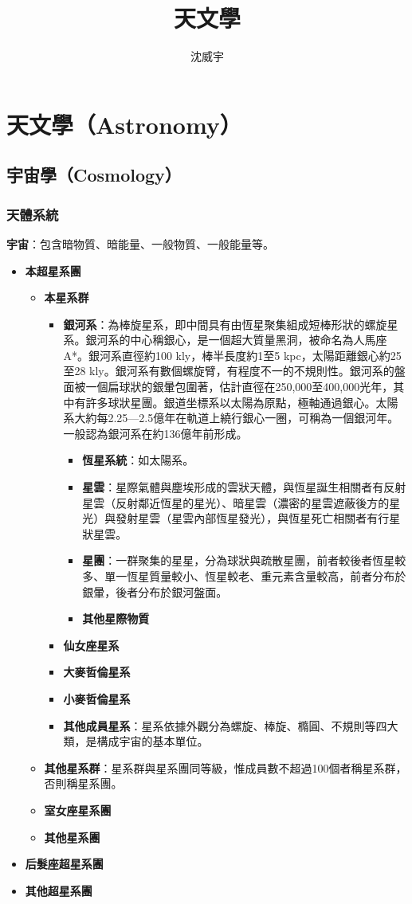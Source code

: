 \documentclass[a4paper,12pt]{report}
\begin{document}
\title{天文學}
\author{沈威宇}
\date{\temtoday}
\titletocdoc
\chapter{天文學（Astronomy）}
\section{宇宙學（Cosmology）}
\subsection{天體系統}
\textbf{宇宙}：包含暗物質、暗能量、一般物質、一般能量等。
\begin{itemize}
\item \textbf{本超星系團}
\begin{itemize}
\item \textbf{本星系群}
\begin{itemize}
\item \textbf{銀河系}：為棒旋星系，即中間具有由恆星聚集組成短棒形狀的螺旋星系。銀河系的中心稱銀心，是一個超大質量黑洞，被命名為人馬座A*。銀河系直徑約100 kly，棒半長度約1至5 kpc，太陽距離銀心約25至28 kly。銀河系有數個螺旋臂，有程度不一的不規則性。銀河系的盤面被一個扁球狀的銀暈包圍著，估計直徑在250,000至400,000光年，其中有許多球狀星團。銀道坐標系以太陽為原點，極軸通過銀心。太陽系大約每2.25—2.5億年在軌道上繞行銀心一圈，可稱為一個銀河年。一般認為銀河系在約136億年前形成。
\begin{itemize}
\item \textbf{恆星系統}：如太陽系。
\item \textbf{星雲}：星際氣體與塵埃形成的雲狀天體，與恆星誕生相關者有反射星雲（反射鄰近恆星的星光）、暗星雲（濃密的星雲遮蔽後方的星光）與發射星雲（星雲內部恆星發光），與恆星死亡相關者有行星狀星雲。
\item \textbf{星團}：一群聚集的星星，分為球狀與疏散星團，前者較後者恆星較多、單一恆星質量較小、恆星較老、重元素含量較高，前者分布於銀暈，後者分布於銀河盤面。
\item\textbf{其他星際物質}
\end{itemize}
\item \textbf{仙女座星系}
\item \textbf{大麥哲倫星系}
\item \textbf{小麥哲倫星系}
\item \textbf{其他成員星系}：星系依據外觀分為螺旋、棒旋、橢圓、不規則等四大類，是構成宇宙的基本單位。
\end{itemize}
\item \textbf{其他星系群}：星系群與星系團同等級，惟成員數不超過100個者稱星系群，否則稱星系團。
\item \textbf{室女座星系團}
\item \textbf{其他星系團}
\end{itemize}
\item \textbf{后髮座超星系團}
\item \textbf{其他超星系團}
\end{itemize}
\end{document}
